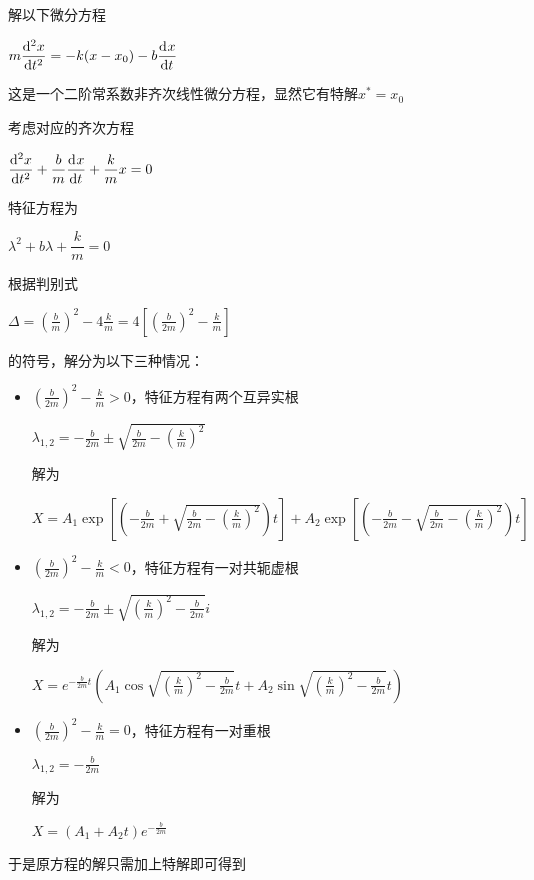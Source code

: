 \begin{prove}[求解阻尼振动的微分方程]
    解以下微分方程
    \begin{center}
        $m\D[2]{x}{t}=-k(x-x_0)-b\D[]{x}{t}$
    \end{center}
    这是一个二阶常系数非齐次线性微分方程，显然它有特解$x^*=x_0$\par
    考虑对应的齐次方程\par
    \begin{center}
        $\D[2]{x}{t}+\dfrac{b}{m}\D[]{x}{t}+\dfrac{k}{m}x=0$
    \end{center}
    特征方程为\par
    \begin{center}
        $\lambda^2+b\lambda+\dfrac{k}{m}=0$
    \end{center}
    根据判别式
    \begin{center}
        $\Delta=\left(\frac{b}{m}\right)^2-4\frac{k}{m}=4\left[\left(\frac{b}{2m}\right)^2-\frac{k}{m}\right]$
    \end{center}
    的符号，解分为以下三种情况：
    \begin{itemize}
        \item $\left(\frac{b}{2m}\right)^2-\frac{k}{m}>0$，特征方程有两个互异实根
              \begin{center}
                  $\lambda_{1,2}=-\frac{b}{2m}\pm\sqrt{\frac{b}{2m}-(\frac{k}{m})^2}$
              \end{center}
              解为
              \begin{center}
                  $X=A_1\exp\left[\left(-\frac{b}{2m}+\sqrt{\frac{b}{2m}-(\frac{k}{m})^2}\right)t\right]+A_2\exp\left[\left(-\frac{b}{2m}-\sqrt{\frac{b}{2m}-(\frac{k}{m})^2}\right)t\right]$
              \end{center}
        \item $\left(\frac{b}{2m}\right)^2-\frac{k}{m}<0$，特征方程有一对共轭虚根
              \begin{center}
                  $\lambda_{1,2}=-\frac{b}{2m}\pm\sqrt{(\frac{k}{m})^2-\frac{b}{2m}}i$
              \end{center}
              解为
              \begin{center}
                  $X=e^{-\frac{b}{2m}t}\left(A_1\cos\sqrt{(\frac{k}{m})^2-\frac{b}{2m}}t+A_2\sin\sqrt{(\frac{k}{m})^2-\frac{b}{2m}}t\right)$
              \end{center}
        \item $\left(\frac{b}{2m}\right)^2-\frac{k}{m}=0$，特征方程有一对重根
              \begin{center}
                  $\lambda_{1,2}=-\frac{b}{2m}$
              \end{center}
              解为
              \begin{center}
                  $X=(A_1+A_2t)e^{-\frac{b}{2m}}$
              \end{center}
    \end{itemize}
    于是原方程的解只需加上特解即可得到
\end{prove}

